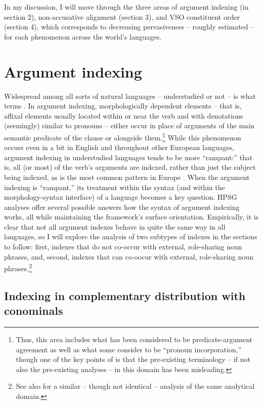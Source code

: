 \documentclass[output=paper]{langsci/langscibook}
\begin{document}
{In my discussion, I will move through the three areas of argument indexing (in section 2), non-accusative alignment (section 3), and VSO constituent order (section 4), which corresponds to decreasing pervasiveness -- roughly estimated -- for each phenomenon across the world's languages.       

\section{Argument indexing}

Widespread among all sorts of natural languages -- understudied or not -- is what \citet{haspelmath13} terms . In argument indexing, morphologically dependent elements -- that is, affixal elements usually located within or near the verb and with denotations (seemingly) similar to pronouns -- either occur in place of arguments of the main semantic predicate of the clause or alongside them.\footnote{Thus, this area includes what has been considered to be predicate-argument agreement as well as what some consider to be ``pronoun incorporation,'' though one of the key points of \citet{haspelmath13} is that the pre-existing terminology -- if not also the pre-existing analyses -- in this domain has been misleading.} While this phenomenon occurs even in a bit in English and throughout other European languages, argument indexing in understudied languages tends to be more ``rampant:'' that is, all (or most) of the verb's arguments are indexed, rather than just the subject being indexed, as is the most common pattern in Europe \citep{siewierskaWALSvpm}. When the argument indexing is ``rampant,'' its treatment within the syntax (and within the morphology-syntax interface) of a language becomes a key question. HPSG analyses offer several possible answers how the syntax of argument indexing works, all while maintaining the framework's surface orientation. Empirically, it is clear that not all argument indexes behave in quite the same way in all languages, so I will explore the analysis of two subtypes of indexes in the sections to follow: first, indexes that do not co-occur with external, role-sharing noun phrases, and, second, indexes that can co-oocur with external, role-sharing noun phrases.\footnote{See also \citealt{saleem10} for a similar -- though not identical -- analysis of the same analytical domain.}   

\subsection{Indexing in complementary distribution with conominals} \label{pro-indexes}

}
\end{document}
